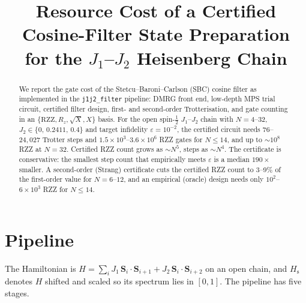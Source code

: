 \documentclass[11pt]{article}
\title{Resource Cost of a Certified Cosine-Filter State Preparation\\
for the $J_1$--$J_2$ Heisenberg Chain}
\author{}
\date{}
\newcommand{\eps}{\varepsilon}
\begin{document}
\maketitle

\begin{abstract}
We report the gate cost of the Stetcu--Baroni--Carlson (SBC) cosine filter as implemented in the
\texttt{j1j2\_filter} pipeline: DMRG front end, low-depth MPS trial circuit, certified filter design,
first- and second-order Trotterisation, and gate counting in an $\{\mathrm{RZZ},R_z,\sqrt{X},X\}$ basis. For the open
spin-$\tfrac12$ $J_1$--$J_2$ chain with $N=4$--$32$, $J_2\in\{0,\,0.2411,\,0.4\}$ and target infidelity
$\eps=10^{-2}$, the certified circuit needs $76$--$24{,}027$ Trotter steps and $1.5\times10^{3}$--$3.6\times10^{6}$
RZZ gates for $N\le 14$, and up to $\sim10^{8}$ RZZ at $N=32$. Certified RZZ count grows as $\sim N^{5}$, steps as
$\sim N^{4}$. The certificate is conservative: the smallest step count that empirically meets $\eps$ is a median
$190\times$ smaller. A second-order (Strang) certificate cuts the certified RZZ count to 3--9\% of the first-order
value for $N=6$--$12$, and an empirical (oracle) design needs only $10^{2}$--$6\times10^{3}$ RZZ for $N\le14$.
\end{abstract}

\section{Pipeline}

The Hamiltonian is $H=\sum_i J_1\,\mathbf S_i\!\cdot\!\mathbf S_{i+1}+J_2\,\mathbf S_i\!\cdot\!\mathbf S_{i+2}$ on an open
chain, and $H_{\mathrm s}$ denotes $H$ shifted and scaled so its spectrum lies in $[0,1]$. The pipeline has five stages.
\end{document}
